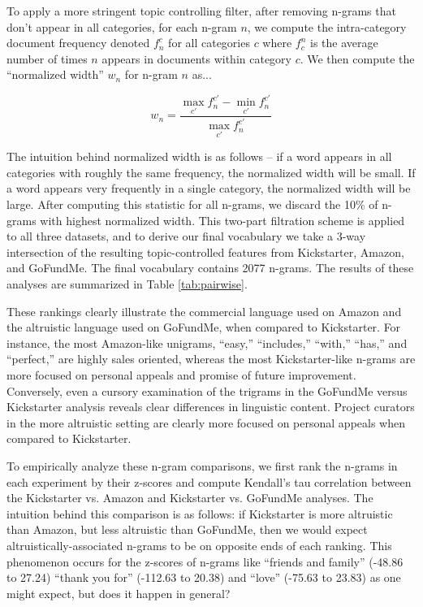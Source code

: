 \documentclass[letterpaper]{article}
\begin{document}
To apply a more stringent topic controlling filter, after removing n-grams that don't appear in all categories, for each n-gram $n$, we compute the intra-category document frequency denoted $f_n^c$ for all categories $c$ where $f^n_c$ is the average number of times $n$ appears in documents within category $c$. We then compute the ``normalized width'' $w_n$ for n-gram $n$ as...

\begin{equation} \label{eq:width}
w_n = \frac{\max\limits_{c'}f_n^{c'} - \min\limits_{c'}f_n^{c'}}{\max\limits_{c'}f_n^{c'}}
\end{equation}

The intuition behind normalized width is as follows -- if a word appears in all categories with roughly the same frequency, the normalized width will be small. If a word appears very frequently in a single category, the normalized width will be large. After computing this statistic for all n-grams, we discard the 10\% of n-grams with highest normalized width. This two-part filtration scheme is applied to all three datasets, and to derive our final vocabulary we take a 3-way intersection of the resulting topic-controlled features from Kickstarter, Amazon, and GoFundMe. The final vocabulary contains 2077 n-grams. The results of these analyses are summarized in Table \ref{tab:pairwise}.

These rankings clearly illustrate the commercial language used on Amazon and the altruistic language used on GoFundMe, when compared to Kickstarter. For instance, the most Amazon-like unigrams, ``easy,'' ``includes,'' ``with,'' ``has,'' and ``perfect,'' are highly sales oriented, whereas the most Kickstarter-like n-grams are more focused on personal appeals and promise of future improvement. Conversely, even a cursory examination of the trigrams in the GoFundMe versus Kickstarter analysis reveals clear differences in linguistic content. Project curators in the more altruistic setting are clearly more focused on personal appeals when compared to Kickstarter.

To empirically analyze these n-gram comparisons, we first rank the n-grams in each experiment by their z-scores and compute Kendall's tau correlation between the Kickstarter vs. Amazon and Kickstarter vs. GoFundMe analyses. The intuition behind this comparison is as follows: if Kickstarter is more altruistic than Amazon, but less altruistic than GoFundMe, then we would expect altruistically-associated n-grams to be on opposite ends of each ranking. This phenomenon occurs for the z-scores of n-grams like ``friends and family'' (-48.86 to 27.24) ``thank you for'' (-112.63 to 20.38) and ``love'' (-75.63 to 23.83) as one might expect, but does it happen in general?
\end{document}
